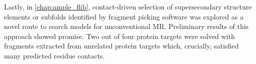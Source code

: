 Lastly, in \cref{chap:ample_flib}, contact-driven selection of supersecondary structure elements or subfolds identified by fragment picking software was explored as a novel route to search models for unconventional MR. Preliminary results of this approach showed promise. Two out of four protein targets were solved with fragments extracted from unrelated protein targets which, crucially, satisfied many predicted residue contacts.

\clearpage
\onehalfspacing
